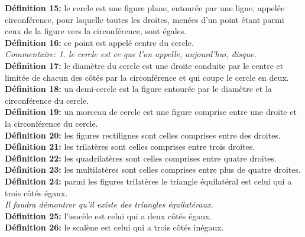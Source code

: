 \documentclass[a4paper, 12pt, twoside]{book}
\begin{document}
\textbf{Définition 15:} le cercle est une figure plane, entourée par une ligne, appelée circonférence, pour laquelle toutes les droites, menées d'un point étant parmi ceux de la figure vers la circonférence, sont égales.\\


\textbf{Définition 16:} ce point est appelé centre du cercle.\\

\textit{Commentaire: 1. le cercle est ce que l'on appelle, aujourd'hui, disque.    
}\\



\textbf{Définition 17:} le diamètre du cercle est une droite conduite par le centre et limitée de chacun des côtés par la circonférence et qui coupe le cercle en deux.\\


\textbf{Définition 18:} un demi-cercle est la figure entourée par le diamètre et la circonférence du cercle.\\

\textbf{Définition 19:} un morceau de cercle est une figure comprise entre une droite et la circonférence du cercle.\\



\textbf{Définition 20:} les figures rectilignes sont celles comprises entre des droites.\\


\textbf{Définition 21:} les trilatères  sont celles comprises entre trois droites.\\

\textbf{Définition 22:} les quadrilatères  sont celles comprises entre quatre droites.\\

\textbf{Définition 23:} les multilatères  sont celles comprises entre plus de quatre droites.\\

\textbf{Définition 24:} parmi les figures trilatères  le triangle équilatéral est celui qui a trois côtés égaux.\\

\textit{Il faudra démontrer qu'il existe des triangles équilatéraux.}\\



\textbf{Définition 25:} l'isocèle est celui qui a deux côtés égaux.\\

\textbf{Définition 26:} le scalène est celui qui a trois côtés inégaux.\\
\end{document}
